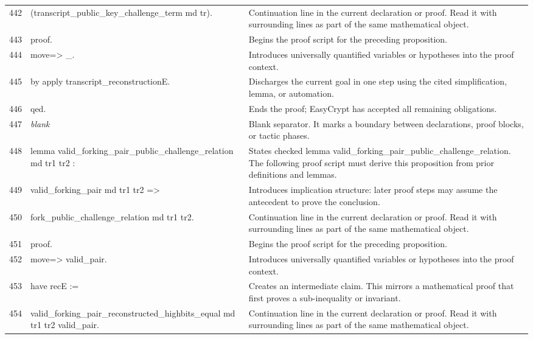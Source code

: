 \documentclass[10pt]{article}
\begin{document}
\begin{longtable}{r L{0.53\textwidth} L{0.37\textwidth}}
442 & {\ttfamily\scriptsize     (transcript\_public\_key\_challenge\_term md tr).} & Continuation line in the current declaration or proof.  Read it with surrounding lines as part of the same mathematical object. \\
443 & {\ttfamily\scriptsize proof.} & Begins the proof script for the preceding proposition. \\
444 & {\ttfamily\scriptsize move=> \_.} & Introduces universally quantified variables or hypotheses into the proof context. \\
445 & {\ttfamily\scriptsize by apply transcript\_reconstructionE.} & Discharges the current goal in one step using the cited simplification, lemma, or automation. \\
446 & {\ttfamily\scriptsize qed.} & Ends the proof; EasyCrypt has accepted all remaining obligations. \\
447 & {\ttfamily\scriptsize \emph{blank}} & Blank separator.  It marks a boundary between declarations, proof blocks, or tactic phases. \\
448 & {\ttfamily\scriptsize lemma valid\_forking\_pair\_public\_challenge\_relation md tr1 tr2 :} & States checked lemma valid\_forking\_pair\_public\_challenge\_relation.  The following proof script must derive this proposition from prior definitions and lemmas. \\
449 & {\ttfamily\scriptsize   valid\_forking\_pair md tr1 tr2 =>} & Introduces implication structure: later proof steps may assume the antecedent to prove the conclusion. \\
450 & {\ttfamily\scriptsize   fork\_public\_challenge\_relation md tr1 tr2.} & Continuation line in the current declaration or proof.  Read it with surrounding lines as part of the same mathematical object. \\
451 & {\ttfamily\scriptsize proof.} & Begins the proof script for the preceding proposition. \\
452 & {\ttfamily\scriptsize move=> valid\_pair.} & Introduces universally quantified variables or hypotheses into the proof context. \\
453 & {\ttfamily\scriptsize have recE :=} & Creates an intermediate claim.  This mirrors a mathematical proof that first proves a sub-inequality or invariant. \\
454 & {\ttfamily\scriptsize   valid\_forking\_pair\_reconstructed\_highbits\_equal md tr1 tr2 valid\_pair.} & Continuation line in the current declaration or proof.  Read it with surrounding lines as part of the same mathematical object. \\

\end{longtable}
\end{document}
